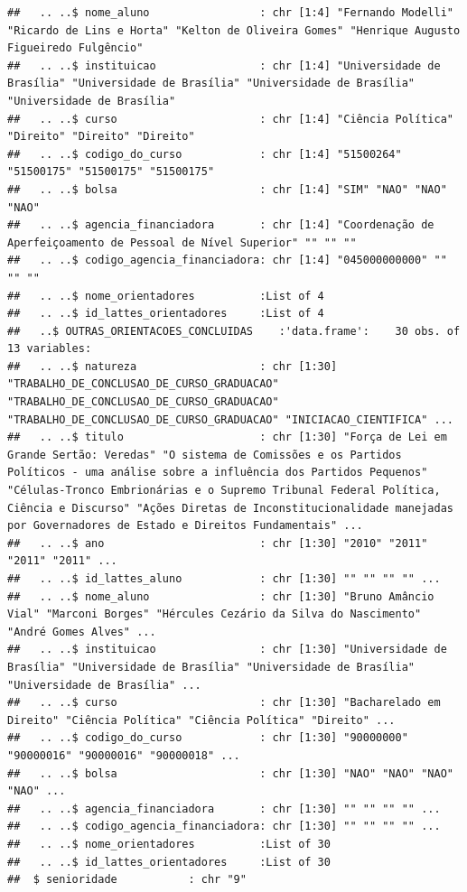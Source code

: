 \documentclass[]{article}
\begin{document}
\begin{verbatim}
##   .. ..$ nome_aluno                 : chr [1:4] "Fernando Modelli" "Ricardo de Lins e Horta" "Kelton de Oliveira Gomes" "Henrique Augusto Figueiredo Fulgêncio"
##   .. ..$ instituicao                : chr [1:4] "Universidade de Brasília" "Universidade de Brasília" "Universidade de Brasília" "Universidade de Brasília"
##   .. ..$ curso                      : chr [1:4] "Ciência Política" "Direito" "Direito" "Direito"
##   .. ..$ codigo_do_curso            : chr [1:4] "51500264" "51500175" "51500175" "51500175"
##   .. ..$ bolsa                      : chr [1:4] "SIM" "NAO" "NAO" "NAO"
##   .. ..$ agencia_financiadora       : chr [1:4] "Coordenação de Aperfeiçoamento de Pessoal de Nível Superior" "" "" ""
##   .. ..$ codigo_agencia_financiadora: chr [1:4] "045000000000" "" "" ""
##   .. ..$ nome_orientadores          :List of 4
##   .. ..$ id_lattes_orientadores     :List of 4
##   ..$ OUTRAS_ORIENTACOES_CONCLUIDAS    :'data.frame':    30 obs. of  13 variables:
##   .. ..$ natureza                   : chr [1:30] "TRABALHO_DE_CONCLUSAO_DE_CURSO_GRADUACAO" "TRABALHO_DE_CONCLUSAO_DE_CURSO_GRADUACAO" "TRABALHO_DE_CONCLUSAO_DE_CURSO_GRADUACAO" "INICIACAO_CIENTIFICA" ...
##   .. ..$ titulo                     : chr [1:30] "Força de Lei em Grande Sertão: Veredas" "O sistema de Comissões e os Partidos Políticos - uma análise sobre a influência dos Partidos Pequenos" "Células-Tronco Embrionárias e o Supremo Tribunal Federal Política, Ciência e Discurso" "Ações Diretas de Inconstitucionalidade manejadas por Governadores de Estado e Direitos Fundamentais" ...
##   .. ..$ ano                        : chr [1:30] "2010" "2011" "2011" "2011" ...
##   .. ..$ id_lattes_aluno            : chr [1:30] "" "" "" "" ...
##   .. ..$ nome_aluno                 : chr [1:30] "Bruno Amâncio Vial" "Marconi Borges" "Hércules Cezário da Silva do Nascimento" "André Gomes Alves" ...
##   .. ..$ instituicao                : chr [1:30] "Universidade de Brasília" "Universidade de Brasília" "Universidade de Brasília" "Universidade de Brasília" ...
##   .. ..$ curso                      : chr [1:30] "Bacharelado em Direito" "Ciência Política" "Ciência Política" "Direito" ...
##   .. ..$ codigo_do_curso            : chr [1:30] "90000000" "90000016" "90000016" "90000018" ...
##   .. ..$ bolsa                      : chr [1:30] "NAO" "NAO" "NAO" "NAO" ...
##   .. ..$ agencia_financiadora       : chr [1:30] "" "" "" "" ...
##   .. ..$ codigo_agencia_financiadora: chr [1:30] "" "" "" "" ...
##   .. ..$ nome_orientadores          :List of 30
##   .. ..$ id_lattes_orientadores     :List of 30
##  $ senioridade           : chr "9"
\end{verbatim}
\end{document}
